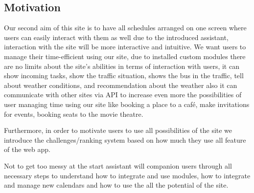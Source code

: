 \subsection{Motivation}
\par Our second aim of this site is to have all schedules arranged on one screen where users can easily interact with them as well due to the introduced assistant, interaction with the site will be more interactive and intuitive. We want users to manage their time-efficient using our site, due to installed custom modules there are no limits about the site's abilities in terms of interaction with users, it can show incoming tasks, show the traffic situation, shows the bus in the traffic, tell about weather conditions, and recommendation about the weather also it can communicate with other sites via API to increase even more the possibilities of user managing time using our site like booking a place to a café, make invitations for events, booking seats to the movie theatre. 

Furthermore, in order to motivate users to use all possibilities of the site we introduce the challenges/ranking system based on how much they use all feature of the web app. 

Not to get too messy at the start assistant will companion users through all necessary steps to understand how to integrate and use modules, how to integrate and manage new calendars and how to use the all the potential of the site. 


\clearpage